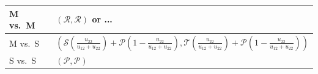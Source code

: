 \documentclass[11pt,reqno]{amsart}
\newcommand{\Rp}{\mathcal{R}} %
\newcommand{\Sp}{\mathcal{S}}
\newcommand{\Tp}{\mathcal{T}}
\newcommand{\Pp}{\mathcal{P}}
\begin{document}
\begin{table}[htbp]
\begin{tabular}{@{}ll@{}}
M vs.~M & $(\Rp,\Rp)$ or ...                                                                                                                                                                                                                                              \\ \midrule
M vs.~S & $\left(\Sp\left(\frac{u_{22}}{u_{12}+u_{22}}\right)+\Pp\left(1-\frac{u_{22}}{u_{12}+u_{22}}\right),\Tp\left(\frac{u_{22}}{u_{12}+u_{22}}\right)+\Pp\left(1-\frac{u_{22}}{u_{12}+u_{22}}\right)\right)$                                                          \\ \midrule
S vs.~S & $(\Pp, \Pp)$                                                                                                                                                                                                                                                    \\ \bottomrule
\end{tabular}
\end{table}


\bigskip
\end{document}
